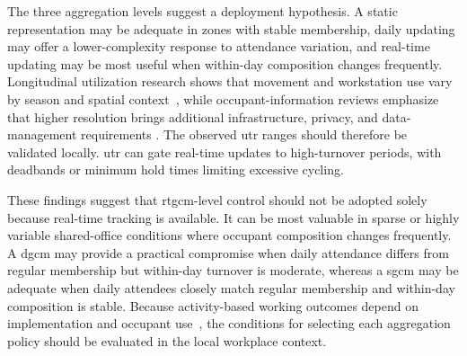 The three aggregation levels suggest a deployment hypothesis.
A static representation may be adequate in zones with stable membership, daily updating may offer a lower-complexity response to attendance variation, and real-time updating may be most useful when within-day composition changes frequently.
Longitudinal utilization research shows that movement and workstation use vary by season and spatial context~\cite{gocer_overlaps_2022}, while occupant-information reviews emphasize that higher resolution brings additional infrastructure, privacy, and data-management requirements \cite{nagy_ten_2023}\cite{obrien_key_2020}\cite{zafari_survey_2019}.
The observed \ac{utr} ranges should therefore be validated locally.
\ac{utr} can gate real-time updates to high-turnover periods, with deadbands or minimum hold times limiting excessive cycling.

These findings suggest that \ac{rtgcm}-level control should not be adopted solely because real-time tracking is available.
It can be most valuable in sparse or highly variable shared-office conditions where occupant composition changes frequently.
A \ac{dgcm} may provide a practical compromise when daily attendance differs from regular membership but within-day turnover is moderate, whereas a \ac{sgcm} may be adequate when daily attendees closely match regular membership and within-day composition is stable. 
Because activity-based working outcomes depend on implementation and occupant use~\cite{marzban_review_2023}, the conditions for selecting each aggregation policy should be evaluated in the local workplace context. 

